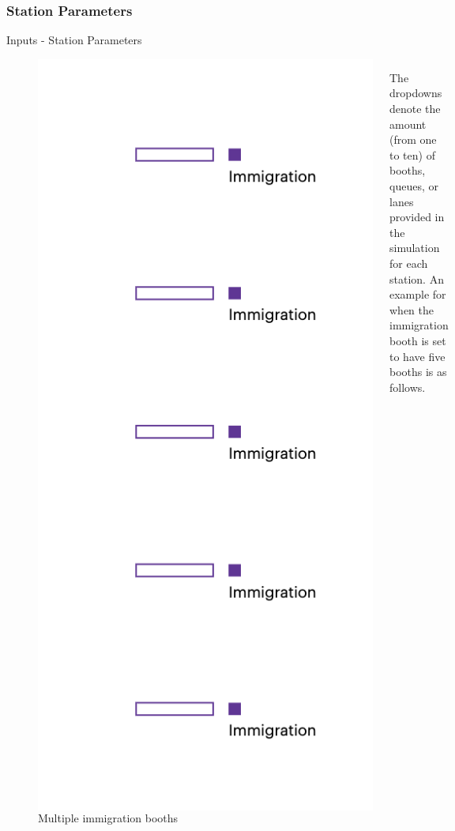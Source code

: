\documentclass{beamer}
\begin{document}
\subsubsection*{Station Parameters}
\begin{frame}{Inputs - Station Parameters}
	\begin{figure}
		
		\begin{columns}
			\includegraphics[scale=0.4]{../img/example2}
			\caption{Multiple immigration booths}
			The dropdowns denote the amount (from one to ten) of booths, queues, or lanes provided in the simulation for each station. An example for when the immigration booth is set to have five booths is as follows.
		\end{columns}
	\end{figure}
\end{frame}
\end{document}
